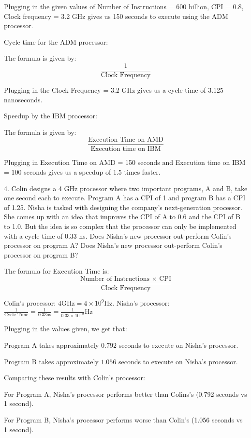 \documentclass{article}
\begin{document}
Plugging in the given values of Number of Instructions = 600 billion, CPI = 0.8,
Clock frequency = 3.2 GHz
gives us 150 seconds to execute using the ADM processor.

Cycle time for the ADM processor:

The formula is given by: \[\frac{1}{\text{Clock Frequency}}\]

Plugging in the Clock Frequency = 3.2 GHz gives us a cycle time of 3.125 nanoseconds.

Speedup by the IBM processor:

The formula is given by: \[\frac{\text{Execution Time on AMD}}{\text{Execution time on IBM}}\]

Plugging in Execution Time on AMD = 150 seconds and Execution time on IBM = 100 seconds
gives us a speedup of 1.5 times faster.


4. Colin designs a 4 GHz processor where two important programs, A and B, take one second each to execute.
Program A has a CPI of 1 and program B has a CPI of 1.25. Nisha is tasked with designing the company's next-generation
processor. She comes up with an idea that improves the CPI of A to 0.6 and the CPI of B to 1.0. But the idea is so
complex that the processor can only be implemented with a cycle time of 0.33 ns. Does Nisha's new processor out-perform
Colin's processor on program A? Does Nisha's new processor out-perform Colin's processor on program B?

The formula for Execution Time is:
\[\frac{\text{Number of Instructions $\times$ CPI}}{\text{Clock Frequency}}\]

Colin's processor: $4 \text{GHz} = 4 \times 10^9 \text{Hz}$.
Nisha's processor: $\frac{1}{\text{Cycle Time}} = \frac{1}{0.33 \text{ns}} = \frac{1}{0.33 \times 10^{-9}} \text{Hz}$

Plugging in the values given, we get that:

Program A takes approximately $0.792$ seconds to execute on Nisha's processor.

Program B takes approximately $1.056$ seconds to execute on Nisha's processor.

Comparing these results with Colin's processor:

For Program A, Nisha's processor performs better than Colins's (0.792 seconds vs 1 second).

For Program B, Nisha's processor performs worse than Colin's (1.056 seconds vs 1 second).
\end{document}
